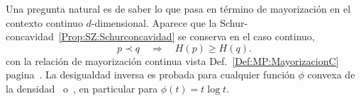 Una pregunta natural  es de saber lo que pasa en  t\'ermino de mayorizaci\'on en
el contexto continuo $d$-dimensional.
%
%
Aparece que la Schur-concavidad~\ref{Prop:SZ:Schurconcavidad}  se conserva  en el
caso  continuo, \ie
%
\[
p \prec  q  \quad \Rightarrow  \quad H(p)  \ge H(q).
\]
%
con      la      relaci\'on      de      mayorizaci\'on      continua      vista
Def.~\ref{Def:MP:MayorizacionC}      pagina~\pageref{Def:MP:MayorizacionC}.       La
desigualdad inversa  es probada  para cualquier funci\'on  $\phi$ convexa  de la
densidad~\cite{Cho74} o~\cite[Prop.~7.3]{WanMad04},  en particular para $\phi(t)
= t \log t$.

